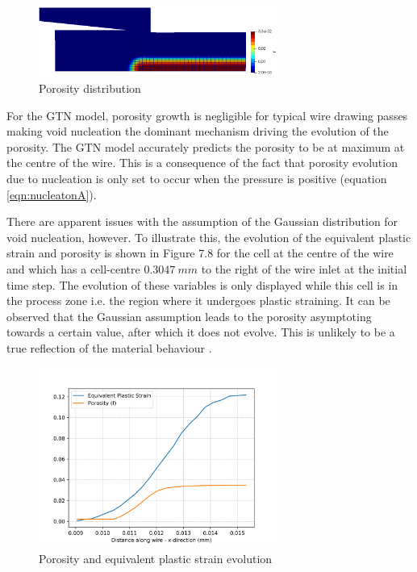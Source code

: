 \documentclass[sn-mathphys,Numbered,draft]{sn-jnl}%
\begin{document}
\begin{figure}[htb]
\begin{center}
	\includegraphics[width=0.7\textwidth]{./Figures/SimulationAndAnalysis/modelCompare/gtnModel.png}
\caption{Porosity distribution}
\label{fig:notchedRoundBAr}
\end{center}
\end{figure}

For the GTN model, porosity growth is negligible for typical wire drawing passes \cite{cao_modelling_2014} making void nucleation the dominant mechanism driving the evolution of the porosity. The GTN model accurately predicts the porosity to be at maximum at the centre of the wire. This is a consequence of the fact that porosity evolution due to nucleation is only set to occur when the pressure is positive (equation \ref{eqn:nucleatonA}). 

There are apparent issues with the assumption of the Gaussian distribution for void nucleation, however. To illustrate this, the evolution of the equivalent plastic strain and porosity is shown in Figure 7.8 for the cell at the centre of the wire and which has a cell-centre $0.3047\ mm$ to the right of the wire inlet at the initial time step. The evolution of these variables is only displayed while this cell is in the process zone i.e. the region where it undergoes plastic straining. It can be observed that the Gaussian assumption leads to the porosity asymptoting towards a certain value, after which it does not evolve. This is unlikely to be a true reflection of the material behaviour \cite{cao_modelling_2014}.

\begin{figure}[htb]
\begin{center}
	\includegraphics[width=0.7\textwidth]{./Figures/SimulationAndAnalysis/modelCompare/GTNElement.png}
\caption{Porosity and equivalent plastic strain evolution}
\label{fig:notchedRoundBAr}
\end{center}
\end{figure}
\end{document}
